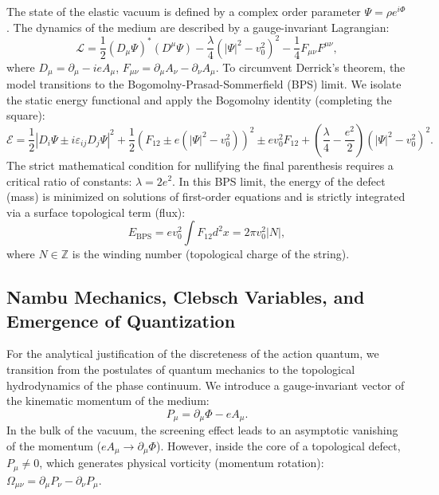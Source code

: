 \documentclass[11pt,a4paper]{article}
\begin{document}
	The state of the elastic vacuum is defined by a complex order parameter $\Psi = \rho e^{i\Phi}$. The dynamics of the medium are described by a gauge-invariant Lagrangian:
	\begin{equation}
		\mathcal{L} = \frac{1}{2} (D_\mu \Psi)^* (D^\mu \Psi) - \frac{\lambda}{4} (|\Psi|^2 - v_0^2)^2 - \frac{1}{4} F_{\mu\nu} F^{\mu\nu},
		\label{eq:lagrangian}
	\end{equation}
	where $D_\mu = \partial_\mu - i e A_\mu$, $F_{\mu\nu} = \partial_\mu A_\nu - \partial_\nu A_\mu$. 
	To circumvent Derrick's theorem, the model transitions to the Bogomolny-Prasad-Sommerfield (BPS) limit. We isolate the static energy functional and apply the Bogomolny identity (completing the square):
	\begin{equation}
		\mathcal{E} = \frac{1}{2} |D_i \Psi \pm i \varepsilon_{ij} D_j \Psi|^2 + \frac{1}{2} \left(F_{12} \pm e(|\Psi|^2 - v_0^2)\right)^2 \pm e v_0^2 F_{12} + \left(\frac{\lambda}{4} - \frac{e^2}{2}\right) (|\Psi|^2 - v_0^2)^2.
	\end{equation}
	The strict mathematical condition for nullifying the final parenthesis requires a critical ratio of constants: $\lambda = 2e^2$. In this BPS limit, the energy of the defect (mass) is minimized on solutions of first-order equations and is strictly integrated via a surface topological term (flux):
	\begin{equation}
		E_{\text{BPS}} = e v_0^2 \int F_{12} d^2x = 2\pi v_0^2 |N|,
	\end{equation}
	where $N \in \mathbb{Z}$ is the winding number (topological charge of the string).
	
	\subsection{Nambu Mechanics, Clebsch Variables, and Emergence of Quantization}
	For the analytical justification of the discreteness of the action quantum, we transition from the postulates of quantum mechanics to the topological hydrodynamics of the phase continuum. 
	We introduce a gauge-invariant vector of the kinematic momentum of the medium:
	\begin{equation}
		P_\mu = \partial_\mu \Phi - e A_\mu.
	\end{equation}
	In the bulk of the vacuum, the screening effect leads to an asymptotic vanishing of the momentum ($e A_\mu \to \partial_\mu \Phi$). However, inside the core of a topological defect, $P_\mu \neq 0$, which generates physical vorticity (momentum rotation): $\Omega_{\mu\nu} = \partial_\mu P_\nu - \partial_\nu P_\mu$.
	
\end{document}
